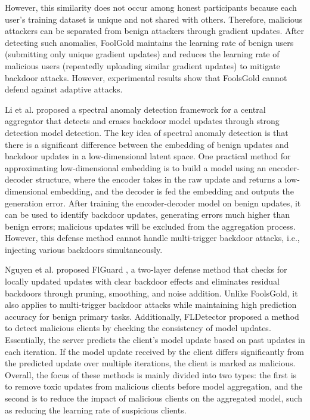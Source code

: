 \documentclass[conference]{IEEEtran}
\begin{document}
However, this similarity does not occur among honest participants because each user's training dataset is unique and not shared with others.
Therefore, malicious attackers can be separated from benign attackers through gradient updates. After detecting such anomalies,
FoolGold maintains the learning rate of benign users (submitting only unique gradient updates) and reduces the learning rate of malicious users
(repeatedly uploading similar gradient updates) to mitigate backdoor attacks. However, experimental results show that
FoolsGold cannot defend against adaptive attacks.

Li et al. \cite{b79} proposed a spectral anomaly detection framework for a
central aggregator that detects and erases backdoor model updates through strong detection model detection.
The key idea of spectral anomaly detection is that there is a significant difference between the embedding
of benign updates and backdoor updates in a low-dimensional latent space. One practical method for approximating
low-dimensional embedding is to build a model using an encoder-decoder structure, where the encoder takes
in the raw update and returns a low-dimensional embedding, and the decoder is fed the embedding and outputs
the generation error.  After training the encoder-decoder model on benign updates, it can be used to identify
backdoor updates, generating errors much higher than benign errors; malicious updates will be excluded from
the aggregation process. However, this defense method cannot handle multi-trigger backdoor attacks, i.e.,
injecting various backdoors simultaneously.

Nguyen et al. proposed FlGuard \cite{b80}, a two-layer defense method that checks
for locally updated updates with clear backdoor effects and eliminates residual backdoors through pruning, smoothing, and noise
addition. Unlike FoolsGold\cite{b78}, it also applies to multi-trigger backdoor attacks while maintaining high prediction accuracy for benign primary tasks.
Additionally, FLDetector \cite{b81} proposed a method to detect malicious clients by checking the consistency of model updates. Essentially,
the server predicts the client's model update based on past updates in each iteration. If the model update received by the client
differs significantly from the predicted update over multiple iterations, the client is marked as malicious. Overall, the focus of
these methods is mainly divided into two types: the first is to remove toxic updates from malicious clients before model aggregation,
and the second is to reduce the impact of malicious clients on the aggregated model, such as reducing the learning rate of suspicious clients.
\end{document}
